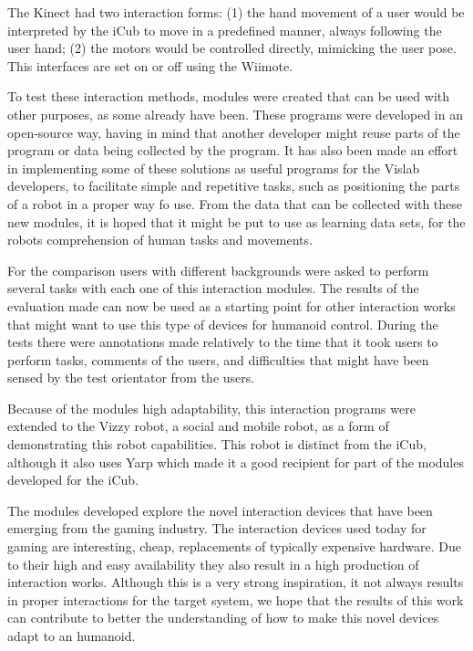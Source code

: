  The Kinect had two interaction forms: (1) the hand movement of a user would be interpreted by the iCub to move in a predefined manner, always following the user hand; (2) the motors would be controlled directly, mimicking the user pose. This interfaces are set on or off using the \ac{Wiimote}.
 
 To test these interaction methods, modules were created that can be used with other purposes, as some already have been. These programs were developed in an open-source way, having in mind that another developer might reuse parts of the program or data being collected by the program. It has also been made an effort in implementing some of these solutions as useful programs for the Vislab developers, to facilitate simple and repetitive tasks, such as positioning the parts of a robot in a proper way fo use. From the data that can be collected with these new modules, it is hoped that it might be put to use as learning data sets, for the robots comprehension of human tasks and movements.
 
 For the comparison users with different backgrounds were asked to perform several tasks with each one of this interaction modules. The results of the evaluation made can now be used as a starting point for other interaction works that might want to use this type of devices for humanoid control. During the tests there were annotations made relatively to the time that it took users to perform tasks, comments of the users, and difficulties that might have been sensed by the test orientator from the users. 
 
 Because of the modules high adaptability, this interaction programs were extended to the Vizzy robot, a social and mobile robot, as a form of demonstrating this robot capabilities. This robot is distinct from the iCub, although it also uses Yarp which made it a good recipient for part of the modules developed for the iCub.
 
 The modules developed explore the novel interaction devices that have been emerging from the gaming industry. The interaction devices used today for gaming are interesting, cheap, replacements of typically expensive hardware. Due to their high and easy availability they also result in a high production of interaction works. Although this is a very strong inspiration, it not always results in proper interactions for the target system, we hope that the results of this work can contribute to better the understanding of how to make this novel devices adapt to an humanoid.
 
